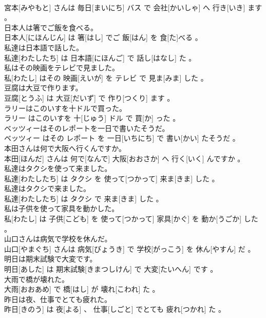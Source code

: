 \documentclass[8pt]{extreport}
\begin{document}
\begin{CJK}{UTF8}{min}
\\	宮本[みやもと] さんは 毎日[まいにち] バス で 会社[かいしゃ] へ 行き[いき] ます 。
\\	日本人は箸でご飯を食べる。	
\\	日本人[にほんじん] は 箸[はし] でご 飯[はん] を 食[た]べる 。
\\	私達は日本語で話した。	
\\	私達[わたしたち] は 日本語[にほんご] で 話し[はなし] た 。
\\	私はその映画をテレビで見ました。	
\\	私[わたし] はその 映画[えいが] を テレビ で 見ま[みま] した 。
\\	豆腐は大豆で作ります。	
\\	豆腐[とうふ] は 大豆[だいず] で 作り[つくり] ます 。
\\	ラリーはこのいすを十ドルで買った。	
\\	ラリー はこのいすを 十[じゅう] ドル で 買[か] った 。
\\	ベッツィーはそのレポートを一日で書いたそうだ。	
\\	ベッツィー はその レポート を 一日[いちにち] で 書い[かい] たそうだ 。
\\	本田さんは何で大阪へ行くんですか。	
\\	本田[ほんだ] さんは 何で[なんで] 大阪[おおさか] へ 行く[いく] んですか 。
\\	私達はタクシを使って来ました。	
\\	私達[わたしたち] は タクシ を 使って[つかって] 来ま[きま] した 。
\\	私達はタクシで来ました。	
\\	私達[わたしたち] は タクシ で 来ま[きま] した 。
\\	私は子供を使って家具を動かした。	
\\	私[わたし] は 子供[こども] を 使って[つかって] 家具[かぐ] を 動か[うごか] した 。
\\	山口さんは病気で学校を休んだ。	
\\	山口[やまぐち] さんは 病気[びょうき] で 学校[がっこう] を 休ん[やすん] だ 。
\\	明日は期末試験で大変です。	
\\	明日[あした] は 期末試験[きまつしけん] で 大変[たいへん] です 。
\\	大雨で橋が壊れた。	
\\	大雨[おおあめ] で 橋[はし] が 壊れ[こわれ] た 。
\\	昨日は夜、仕事でとても疲れた。	
\\	昨日[きのう] は 夜[よる] 、 仕事[しごと] でとても 疲れ[つかれ] た 。

\end{CJK}
\end{document}
